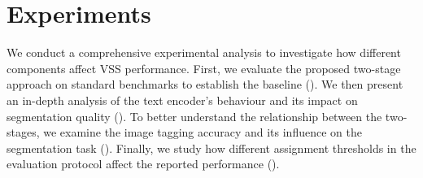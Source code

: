 \begin{table}[t]
\centering
\caption{Results over the benchmark datasets. The mIoU is reported. %
}
\label{tab:sota_results}
\end{table}

\section{Experiments}
\label{ch:results}

We conduct a comprehensive experimental analysis to investigate how different components affect VSS performance.
First, we evaluate the proposed two-stage approach on standard benchmarks to establish the baseline (). We then present an in-depth analysis of the text encoder's behaviour and its impact on segmentation quality (). To better understand the relationship between the two-stages, we examine the image tagging accuracy and its influence on the segmentation task (). Finally, we study how different assignment thresholds in the evaluation protocol affect the reported performance ().

